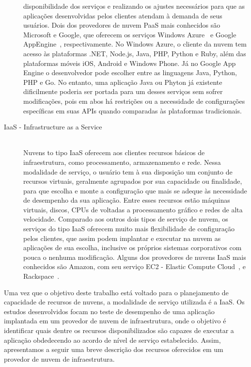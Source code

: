 \begin{description}
disponibilidade dos serviços e realizando os ajustes necessários para que as 
aplicações desenvolvidas pelos clientes atendam à demanda de seus usuários. 
Dois dos provedores de nuvem PaaS mais conhecidos são Microsoft e Google, que 
oferecem os serviços Windows Azure~\cite{azure} e Google AppEngine~\cite{appengine}, 
respectivamente. No Windows Azure, o cliente da nuvem tem acesso às plataformas 
.NET, Node.js, Java, PHP, Python e Ruby, além das plataformas móveis iOS, Android
e Windows Phone. Já no Google App Engine o desenvolvedor pode escolher entre 
as linguagens Java, Python, PHP e Go. No entanto, uma aplicação Java ou Phyton 
já existente dificilmente poderia ser portada para um desses serviços sem sofrer 
modificações, pois em abos há restrições ou a necessidade de configurações específicas
em suas APIs quando comparadas às plataformas tradicionais.
\item[IaaS - Infrastructure as a Service] \hfill \\ Nuvens to tipo IaaS oferecem 
aos clientes recursos básicos de infraestrutura, como processamento, armazenamento 
e rede. Nessa modalidade de serviço, o usuário tem à sua disposição um conjunto
de recursos virtuais, geralmente agrupados por sua capacidade ou finalidade, para
que escolha e monte a configuração que mais se adeque às necessidade de desempenho
da sua aplicação. Entre esses recursos estão máquinas virtuais, discos,
CPUs de voltadas a processamento gráfico e redes de alta velocidade. Comparado 
aos outros dois tipos de serviço de nuvem, os serviços do tipo IaaS oferecem muito 
mais flexibilidade de configuração pelos clientes, que assim podem implantar e 
executar na nuvem as aplicações de sua escolha, inclusive os próprios sistemas 
corporativos com pouca o nenhuma modificação. Alguns dos provedores de nuvens 
IaaS mais conhecidos são Amazon, com seu serviço EC2 - Elastic Compute 
Cloud~\cite{ec2}, e Rackspace~\cite{rackspace}.
\end{description}

Uma vez que o objetivo deste trabalho está voltado para o planejamento de capacidade
de recursos de nuvens, a modalidade de serviço utilizada é a IaaS. Os estudos 
desenvolvidos focam no teste de desempenho de uma aplicação implantada em um
provedor de nuvem de infraestrutura, onde o objetivo é identificar quais dentre
os recursos disponibilizados são capazes de executar a aplicação obdedecendo ao 
acordo de nível de serviço estabelecido. Assim, apresentamos a seguir uma breve
descrição dos recursos oferecidos em um provedor de nuvem de infraestrutura. 

